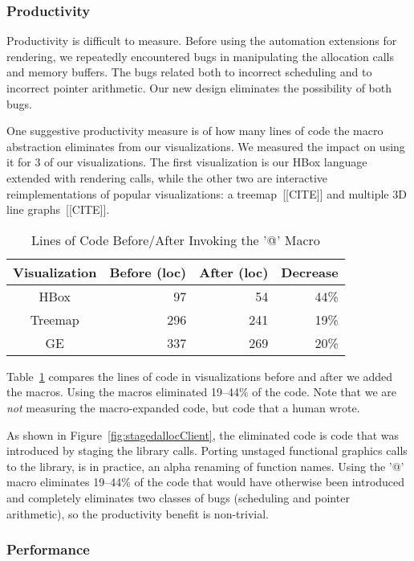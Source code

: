 \subsubsection{Productivity}
Productivity is difficult to measure. Before using the automation extensions for rendering, we repeatedly encountered bugs in manipulating the allocation calls and memory buffers. The bugs related both to incorrect scheduling and to incorrect pointer arithmetic. Our new design eliminates the possibility of both bugs.

One suggestive productivity measure is of how many lines of code the macro abstraction eliminates from our visualizations. We measured the impact on using it for 3 of our visualizations. The first visualization is our HBox language extended with rendering calls, while the other two are interactive reimplementations of popular visualizations: a treemap~[[CITE]] and multiple 3D line graphs~[[CITE]].


\begin{table}[ht]
\caption{Lines of Code Before/After Invoking the '@' Macro}
\centering
\begin{tabular}{c r r r}
\hline\hline
 \textbf{Visualization} & \textbf{Before (loc)} & \textbf{After (loc)} & \textbf{Decrease} \\ [0.5ex] \hline
  HBox & 97 & 54 & 44\% \\
  Treemap & 296 & 241 & 19\% \\
  GE & 337 & 269 & 20\% \\ [1ex] 
\hline
\end{tabular}
\label{table:macroreduction}
\end{table}
Table~\ref{table:macroreduction} compares the lines of code in visualizations before and after we added the macros. Using the macros eliminated 19--44\% of the code. Note that we are \emph{not} measuring the macro-expanded code, but code that a human wrote.



As shown in Figure~\ref{fig:stagedallocClient}, the eliminated code is code that was introduced by staging the library calls. Porting unstaged functional graphics calls to the library, is in practice, an alpha renaming of function names.  Using the '@' macro eliminates 19--44\% of the code that would have otherwise been introduced and completely eliminates two classes of bugs (scheduling and pointer arithmetic), so the productivity benefit is non-trivial. 

\subsubsection{Performance}



